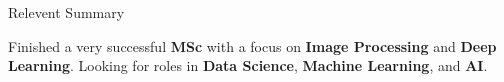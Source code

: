 \begin{cvsection}{Relevent Summary}



Finished a very successful \textbf{MSc} with a focus on \textbf{Image Processing} and 
\textbf{Deep Learning}. Looking for roles in \textbf{Data Science}, \textbf{Machine Learning}, and \textbf{AI}.




\end{cvsection}